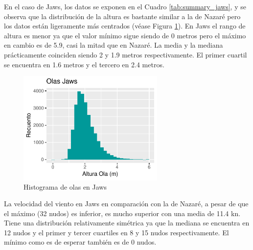 En el caso de Jaws, los datos se exponen en el Cuadro \ref{tab:summary_jaws}, y se observa que la distribución de la altura es bastante similar a la de Nazaré pero los datos están ligeramente más centrados (véase Figura \ref{fig:hist_waves_jaws}). En Jaws el rango de altura es menor ya que el valor mínimo sigue siendo de 0 metros pero el máximo en cambio es de 5.9, casi la mitad que en Nazaré. La media y la mediana prácticamente coinciden siendo 2 y 1.9 metros respectivamente. El primer cuartil se encuentra en 1.6 metros y el tercero en 2.4 metros.

\begin{figure}[H]
    \centering
    \includegraphics[height=5.6cm]{./figures/jaws_hist_wave.pdf}
    \caption{Histograma de olas en Jaws}
    \label{fig:hist_waves_jaws}
\end{figure}

La velocidad del viento en Jaws en comparación con la de Nazaré, a pesar de que el máximo (32 nudos) es inferior, es mucho superior con una media de 11.4 \si{\knot}. Tiene una distribución relativamente simétrica ya que la mediana se encuentra en 12 nudos y el primer y tercer cuartiles en 8 y 15 nudos respectivamente. El mínimo como es de esperar también es de 0 nudos.


